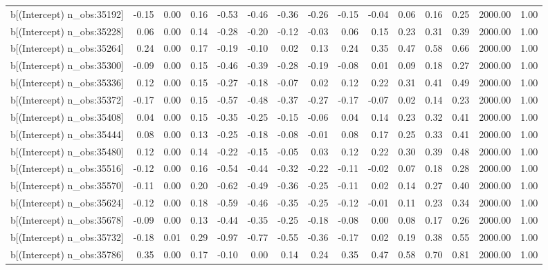 \begin{table}[ht]
\begin{tabular}{rrrrrrrrrrrrrrr}
  b[(Intercept) n\_obs:35192] & -0.15 & 0.00 & 0.16 & -0.53 & -0.46 & -0.36 & -0.26 & -0.15 & -0.04 & 0.06 & 0.16 & 0.25 & 2000.00 & 1.00 \\ 
  b[(Intercept) n\_obs:35228] & 0.06 & 0.00 & 0.14 & -0.28 & -0.20 & -0.12 & -0.03 & 0.06 & 0.15 & 0.23 & 0.31 & 0.39 & 2000.00 & 1.00 \\ 
  b[(Intercept) n\_obs:35264] & 0.24 & 0.00 & 0.17 & -0.19 & -0.10 & 0.02 & 0.13 & 0.24 & 0.35 & 0.47 & 0.58 & 0.66 & 2000.00 & 1.00 \\ 
  b[(Intercept) n\_obs:35300] & -0.09 & 0.00 & 0.15 & -0.46 & -0.39 & -0.28 & -0.19 & -0.08 & 0.01 & 0.09 & 0.18 & 0.27 & 2000.00 & 1.00 \\ 
  b[(Intercept) n\_obs:35336] & 0.12 & 0.00 & 0.15 & -0.27 & -0.18 & -0.07 & 0.02 & 0.12 & 0.22 & 0.31 & 0.41 & 0.49 & 2000.00 & 1.00 \\ 
  b[(Intercept) n\_obs:35372] & -0.17 & 0.00 & 0.15 & -0.57 & -0.48 & -0.37 & -0.27 & -0.17 & -0.07 & 0.02 & 0.14 & 0.23 & 2000.00 & 1.00 \\ 
  b[(Intercept) n\_obs:35408] & 0.04 & 0.00 & 0.15 & -0.35 & -0.25 & -0.15 & -0.06 & 0.04 & 0.14 & 0.23 & 0.32 & 0.41 & 2000.00 & 1.00 \\ 
  b[(Intercept) n\_obs:35444] & 0.08 & 0.00 & 0.13 & -0.25 & -0.18 & -0.08 & -0.01 & 0.08 & 0.17 & 0.25 & 0.33 & 0.41 & 2000.00 & 1.00 \\ 
  b[(Intercept) n\_obs:35480] & 0.12 & 0.00 & 0.14 & -0.22 & -0.15 & -0.05 & 0.03 & 0.12 & 0.22 & 0.30 & 0.39 & 0.48 & 2000.00 & 1.00 \\ 
  b[(Intercept) n\_obs:35516] & -0.12 & 0.00 & 0.16 & -0.54 & -0.44 & -0.32 & -0.22 & -0.11 & -0.02 & 0.07 & 0.18 & 0.28 & 2000.00 & 1.00 \\ 
  b[(Intercept) n\_obs:35570] & -0.11 & 0.00 & 0.20 & -0.62 & -0.49 & -0.36 & -0.25 & -0.11 & 0.02 & 0.14 & 0.27 & 0.40 & 2000.00 & 1.00 \\ 
  b[(Intercept) n\_obs:35624] & -0.12 & 0.00 & 0.18 & -0.59 & -0.46 & -0.35 & -0.25 & -0.12 & -0.01 & 0.11 & 0.23 & 0.34 & 2000.00 & 1.00 \\ 
  b[(Intercept) n\_obs:35678] & -0.09 & 0.00 & 0.13 & -0.44 & -0.35 & -0.25 & -0.18 & -0.08 & 0.00 & 0.08 & 0.17 & 0.26 & 2000.00 & 1.00 \\ 
  b[(Intercept) n\_obs:35732] & -0.18 & 0.01 & 0.29 & -0.97 & -0.77 & -0.55 & -0.36 & -0.17 & 0.02 & 0.19 & 0.38 & 0.55 & 2000.00 & 1.00 \\ 
  b[(Intercept) n\_obs:35786] & 0.35 & 0.00 & 0.17 & -0.10 & 0.00 & 0.14 & 0.24 & 0.35 & 0.47 & 0.58 & 0.70 & 0.81 & 2000.00 & 1.00 \\ 

\end{tabular}
\end{table}

